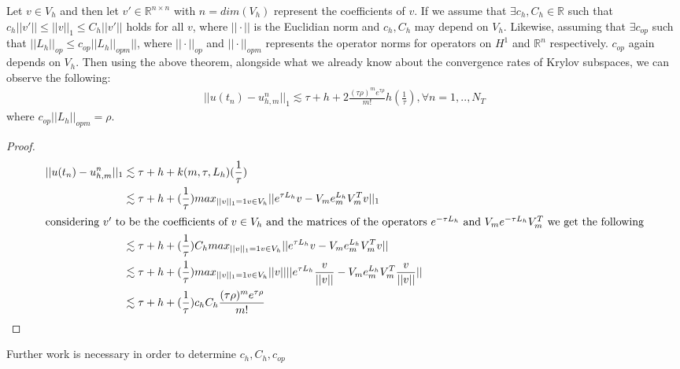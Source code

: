 \begin{corollary}
    Let $v\in V_h$ and then let $v'\in \mathbb{R}^{n\times n}$ with $n = dim(V_h)$ represent the coefficients of $v$.
    If we assume that $\exists c_h,C_h \in \mathbb{R}$ such that $c_h||v'|| \leq ||v||_1 \leq C_h||v'||$ holds for all $v$, where $||\cdot||$ is the Euclidian norm and $c_h,C_h$ may depend on $V_h$.
    Likewise, assuming that $\exists c_{op}$ such that $||L_h||_{op} \leq c_{op} ||L_h||_{opm}||$, where $||\cdot||_{op}$ and $||\cdot||_{opm}$ represents the operator norms for operators on $H^1$ and $\mathbb{R}^n$ respectively.
    $c_{op}$ again depends on $V_h$.
    Then using the above theorem, alongside what we already know about the convergence rates of Krylov subspaces, we can observe the following:
    \begin{align*}
        ||u(t_n) - u_{h,m}^n||_1 \lesssim \tau + h + 2 \frac{(\tau \rho)^m e^{\tau \rho}}{m!}h(\frac{1}{\tau}), \forall n = 1,..,N_T
    \end{align*}
    where $c_{op}||L_h||_{opm} = \rho$.
\end{corollary}
\begin{proof}
    \begin{align*}
        ||u(t_n) - u_{h,m}^n||_1 &\lesssim \tau + h + k(m,\tau, L_h)(\frac{1}{\tau})\\
        &\lesssim \tau + h + (\frac{1}{\tau})max_{||v||_1=1 v\in V_h}||e^{\tau L_h}v - V_m e_m^{L_h}V^T_mv||_1 \\
        \intertext{considering $v'$ to be the coefficients of $v\in V_h$ and the matrices of the operators $e^{-\tau L_h}$ and $V_m e^{-\tau L_h} V^T_m$ we get the following}
        &\lesssim \tau + h + (\frac{1}{\tau})C_hmax_{||v||_1=1 v\in V_h}||e^{\tau L_h}v - V_m e_m^{L_h}V^T_mv||\\
        &\lesssim \tau + h + (\frac{1}{\tau})max_{||v||_1=1 v\in V_h}||v||||e^{\tau L_h}\frac{v}{||v||} - V_m e_m^{L_h}V^T_m\frac{v}{||v||}||\\
        &\lesssim \tau + h + (\frac{1}{\tau})c_h C_h\frac{(\tau \rho)^m e^{\tau \rho}}{m!}
    \end{align*}
\end{proof}

Further work is necessary in order to determine $c_h,C_h,c_{op}$
